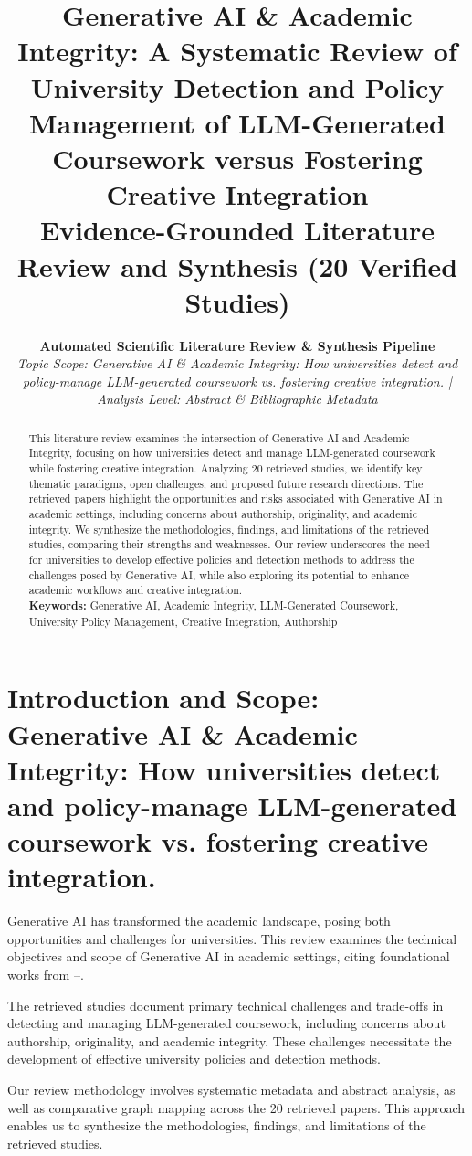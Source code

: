 \documentclass[10pt,twocolumn,letterpaper]{article}
\title{\LARGE \textbf{Generative AI \& Academic Integrity: A Systematic Review of University Detection and Policy Management of LLM-Generated Coursework versus Fostering Creative Integration}\\[4pt]
\large Evidence-Grounded Literature Review and Synthesis (20 Verified Studies)}
\author{\textbf{Automated Scientific Literature Review \& Synthesis Pipeline}\\
\small \textit{Topic Scope: Generative AI \& Academic Integrity: How universities detect and policy-manage LLM-generated coursework vs. fostering creative integration. | Analysis Level: Abstract \& Bibliographic Metadata}}
\date{}
\begin{document}
\maketitle

\begin{abstract}
\noindent This literature review examines the intersection of Generative AI and Academic Integrity, focusing on how universities detect and manage LLM-generated coursework while fostering creative integration. Analyzing 20 retrieved studies, we identify key thematic paradigms, open challenges, and proposed future research directions. The retrieved papers highlight the opportunities and risks associated with Generative AI in academic settings, including concerns about authorship, originality, and academic integrity. We synthesize the methodologies, findings, and limitations of the retrieved studies, comparing their strengths and weaknesses. Our review underscores the need for universities to develop effective policies and detection methods to address the challenges posed by Generative AI, while also exploring its potential to enhance academic workflows and creative integration.
\vspace{4pt}\\
\noindent \textbf{Keywords:} Generative AI, Academic Integrity, LLM-Generated Coursework, University Policy Management, Creative Integration, Authorship
\end{abstract}

\section{Introduction and Scope: Generative AI \& Academic Integrity: How universities detect and policy-manage LLM-generated coursework vs. fostering creative integration.}
Generative AI has transformed the academic landscape, posing both opportunities and challenges for universities. This review examines the technical objectives and scope of Generative AI in academic settings, citing foundational works from \cite{ref1}–\cite{ref20}.

The retrieved studies document primary technical challenges and trade-offs in detecting and managing LLM-generated coursework, including concerns about authorship, originality, and academic integrity. These challenges necessitate the development of effective university policies and detection methods.

Our review methodology involves systematic metadata and abstract analysis, as well as comparative graph mapping across the 20 retrieved papers. This approach enables us to synthesize the methodologies, findings, and limitations of the retrieved studies.
\end{document}
